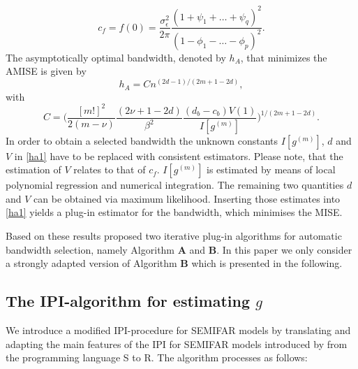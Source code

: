 \documentclass[12pt]{article}
\begin{document}
\begin{equation}
	c_f = f(0) = \frac{\sigma^2_\epsilon}{2\pi} \frac{(1 + \psi_1+\dots+\psi_q)^2}{(1-\phi_1-\dots-\phi_p)^2}.
\end{equation}
 The asymptotically optimal bandwidth, denoted by $h_A$, that minimizes the AMISE is given by
\begin{equation}
	\label{ha1}
h_A=Cn^{(2d-1)/(2m+1-2d)},
\end{equation}
with 
\begin{equation}
\label{ha2}
C=\Bigg(\frac{[m!]^2}{2(m-\nu)} \frac{(2\nu+1-2d)}{\beta^2}\frac{(d_b - c_b)V(1)}{I[g^{(m)}]}\Bigg)^{1/(2m+1-2d)}.
\end{equation} 
In order to obtain a selected bandwidth the unknown constants $I[g^{(m)}]$, $d$ and $V$ in \eqref{ha1} have to be replaced with consistent estimators. Please note, that the estimation of $V$ relates to that of $c_f$. $I[g^{(m)}]$ is estimated by means of local polynomial regression and numerical integration. The remaining two quantities $d$ and $V$ can be obtained via maximum likelihood. Inserting those estimates into \eqref{ha1} yields a plug-in estimator for the bandwidth, which minimises the MISE.

Based on these results \citet{beran2002iterative} proposed two iterative plug-in algorithms for automatic bandwidth selection, namely Algorithm \textbf{A} and \textbf{B}. In this paper we only consider a strongly adapted version of Algorithm \textbf{B} which is presented in the following.
\subsection{The IPI-algorithm for estimating $g$}

We introduce a modified IPI-procedure for SEMIFAR models by translating and adapting the main features of the IPI for SEMIFAR models introduced by \citet{beran2002iterative} from the programming language S to R. The algorithm processes as follows:
\end{document}
